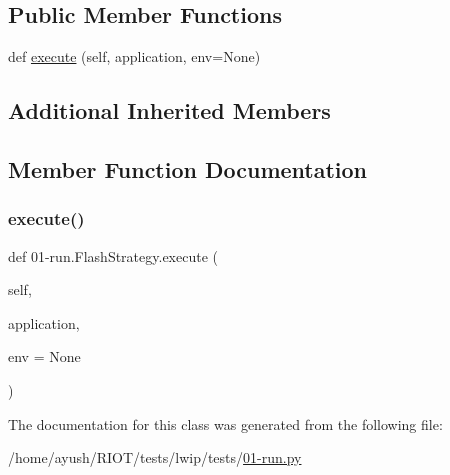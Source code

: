 \subsection*{Public Member Functions}
\begin{DoxyCompactItemize}
\item 
def \hyperlink{class01-run_1_1FlashStrategy_ad3ea16a0af74c1e8e1f8d0dbeaa558ed}{execute} (self, application, env=None)
\end{DoxyCompactItemize}
\subsection*{Additional Inherited Members}


\subsection{Member Function Documentation}
\mbox{\label{class01-run_1_1FlashStrategy_ad3ea16a0af74c1e8e1f8d0dbeaa558ed}} 
\subsubsection{\texorpdfstring{execute()}{execute()}}
{\footnotesize\ttfamily def 01-\/run.\+Flash\+Strategy.\+execute (\begin{DoxyParamCaption}\item[{}]{self,  }\item[{}]{application,  }\item[{}]{env = {\ttfamily None} }\end{DoxyParamCaption})}



The documentation for this class was generated from the following file\+:\begin{DoxyCompactItemize}
\item 
/home/ayush/\+R\+I\+O\+T/tests/lwip/tests/\hyperlink{lwip_2tests_201-run_8py}{01-\/run.\+py}\end{DoxyCompactItemize}
